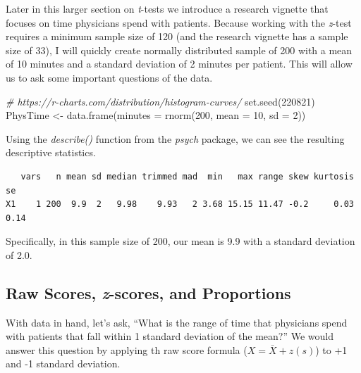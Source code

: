 \documentclass[
  11pt,
]{book}
\newenvironment{Shaded}{\begin{snugshade}}{\end{snugshade}}
\newcommand{\AttributeTok}[1]{\textcolor[rgb]{0.77,0.63,0.00}{#1}}
\newcommand{\CommentTok}[1]{\textcolor[rgb]{0.56,0.35,0.01}{\textit{#1}}}
\newcommand{\DecValTok}[1]{\textcolor[rgb]{0.00,0.00,0.81}{#1}}
\newcommand{\FunctionTok}[1]{\textcolor[rgb]{0.00,0.00,0.00}{#1}}
\newcommand{\NormalTok}[1]{#1}
\newcommand{\OtherTok}[1]{\textcolor[rgb]{0.56,0.35,0.01}{#1}}
\newcommand{\SpecialCharTok}[1]{\textcolor[rgb]{0.00,0.00,0.00}{#1}}
\begin{document}
Later in this larger section on \emph{t}-tests we introduce a research vignette that focuses on time physicians spend with patients. Because working with the \emph{z}-test requires a minimum sample size of 120 (and the research vignette has a sample size of 33), I will quickly create normally distributed sample of 200 with a mean of 10 minutes and a standard deviation of 2 minutes per patient. This will allow us to ask some important questions of the data.

\begin{Shaded}
\begin{Highlighting}[]
\CommentTok{\# https://r{-}charts.com/distribution/histogram{-}curves/}
\FunctionTok{set.seed}\NormalTok{(}\DecValTok{220821}\NormalTok{)}
\NormalTok{PhysTime }\OtherTok{\textless{}{-}} \FunctionTok{data.frame}\NormalTok{(}\AttributeTok{minutes =} \FunctionTok{rnorm}\NormalTok{(}\DecValTok{200}\NormalTok{, }\AttributeTok{mean =} \DecValTok{10}\NormalTok{, }\AttributeTok{sd =} \DecValTok{2}\NormalTok{))}
\end{Highlighting}
\end{Shaded}

Using the \emph{describe()} function from the \emph{psych} package, we can see the resulting descriptive statistics.

\begin{Shaded}
\end{Shaded}

\begin{verbatim}
   vars   n mean sd median trimmed mad  min   max range skew kurtosis   se
X1    1 200  9.9  2   9.98    9.93   2 3.68 15.15 11.47 -0.2     0.03 0.14
\end{verbatim}

Specifically, in this sample size of 200, our mean is 9.9 with a standard deviation of 2.0.

\hypertarget{raw-scores-z-scores-and-proportions}{%
\subsection{\texorpdfstring{Raw Scores, \emph{z}-scores, and Proportions}{Raw Scores, z-scores, and Proportions}}\label{raw-scores-z-scores-and-proportions}}

With data in hand, let's ask, ``What is the range of time that physicians spend with patients that fall within 1 standard deviation of the mean?'' We would answer this question by applying th raw score formula (\(X = \bar{X} + z(s)\)) to +1 and -1 standard deviation.
\end{document}
